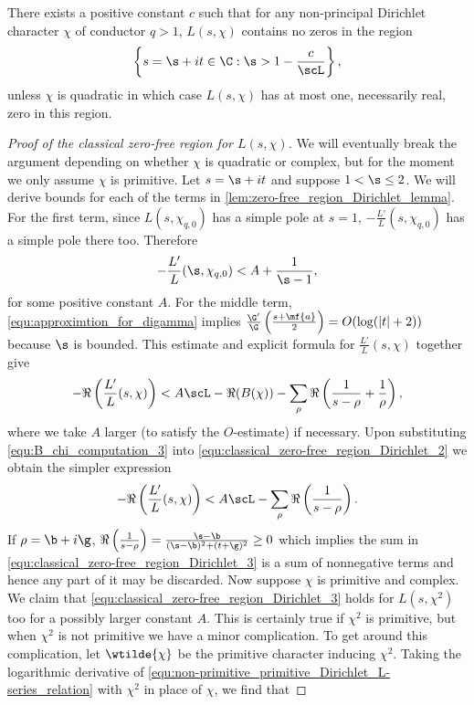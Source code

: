       \begin{theorem}
        There exists a positive constant $c$ such that for any non-principal Dirichlet character $\chi$ of conductor $q > 1$, $L(s,\chi)$ contains no zeros in the region
        \[
          \left\{s = \s+it \in \C:\s > 1-\frac{c}{\scL}\right\},
        \]
        unless $\chi$ is quadratic in which case $L(s,\chi)$ has at most one, necessarily real, zero in this region.
      \end{theorem}
      \begin{proof}[Proof of the classical zero-free region for $L(s,\chi)$]
        We will eventually break the argument depending on whether $\chi$ is quadratic or complex, but for the moment we only assume $\chi$ is primitive. Let $s = \s+it$ and suppose $1 < \s \le 2$. We will derive bounds for each of the terms in \cref{lem:zero-free_region_Dirichlet_lemma}. For the first term, since $L(s,\chi_{q,0})$ has a simple pole at $s = 1$, $-\frac{L'}{L}(s,\chi_{q,0})$ has a simple pole there too. Therefore
        \begin{equation}\label{equ:classical_zero-free_region_Dirichlet_1}
          -\frac{L'}{L}(\s,\chi_{q,0}) < A+\frac{1}{\s-1},
        \end{equation}
        for some positive constant $A$. For the middle term, \cref{equ:approximtion_for_digamma} implies $\frac{\G'}{\G}\left(\frac{s+\mf{a}}{2}\right) = O(\log(|t|+2))$ because $\s$ is bounded. This estimate and explicit formula for $\frac{L'}{L}(s,\chi)$ together give
        \begin{equation}\label{equ:classical_zero-free_region_Dirichlet_2}
          -\Re\left(\frac{L'}{L}(s,\chi)\right) < A\scL-\Re(B(\chi))-\sum_{\rho}\Re\left(\frac{1}{s-\rho}+\frac{1}{\rho}\right),
        \end{equation}
        where we take $A$ larger (to satisfy the $O$-estimate) if necessary. Upon substituting \cref{equ:B_chi_computation_3} into \cref{equ:classical_zero-free_region_Dirichlet_2} we obtain the simpler expression
        \begin{equation}\label{equ:classical_zero-free_region_Dirichlet_3}
          -\Re\left(\frac{L'}{L}(s,\chi)\right) < A\scL-\sum_{\rho}\Re\left(\frac{1}{s-\rho}\right).
        \end{equation}
        If $\rho = \b+i\g$, $\Re\left(\frac{1}{s-\rho}\right) = \frac{\s-\b}{(\s-\b)^{2}+(t+\g)^{2}} \ge 0$ which implies the sum in \cref{equ:classical_zero-free_region_Dirichlet_3} is a sum of nonnegative terms and hence any part of it may be discarded. Now suppose $\chi$ is primitive and complex. We claim that \cref{equ:classical_zero-free_region_Dirichlet_3} holds for $L(s,\chi^{2})$ too for a possibly larger constant $A$. This is certainly true if $\chi^{2}$ is primitive, but when $\chi^{2}$ is not primitive we have a minor complication. To get around this complication, let $\wtilde{\chi}$ be the primitive character inducing $\chi^{2}$. Taking the logarithmic derivative of \cref{equ:non-primitive_primitive_Dirichlet_L-series_relation} with $\chi^{2}$ in place of $\chi$, we find that

\end{proof}
